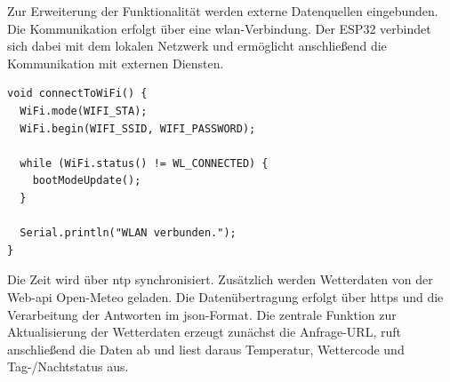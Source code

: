 









Zur Erweiterung der Funktionalität werden externe Datenquellen eingebunden.  
Die Kommunikation erfolgt über eine \gls{wlan}-Verbindung.  
Der ESP32 verbindet sich dabei mit dem lokalen Netzwerk und ermöglicht anschließend die Kommunikation mit externen Diensten.

\begin{lstlisting}[style=arduino,caption={Funktion zum WLAN-Verbindungsaufbau}]
void connectToWiFi() {
  WiFi.mode(WIFI_STA);
  WiFi.begin(WIFI_SSID, WIFI_PASSWORD);

  while (WiFi.status() != WL_CONNECTED) {
    bootModeUpdate();
  }

  Serial.println("WLAN verbunden.");
}
\end{lstlisting}

Die Zeit wird über \gls{ntp} synchronisiert.  
Zusätzlich werden Wetterdaten von der Web-\gls{api} Open-Meteo geladen.  
Die Datenübertragung erfolgt über \gls{https} und die Verarbeitung der Antworten im \gls{json}-Format.
Die zentrale Funktion zur Aktualisierung der Wetterdaten erzeugt zunächst die Anfrage-URL, ruft anschließend die Daten ab und liest daraus Temperatur, Wettercode und Tag-/Nachtstatus aus.

